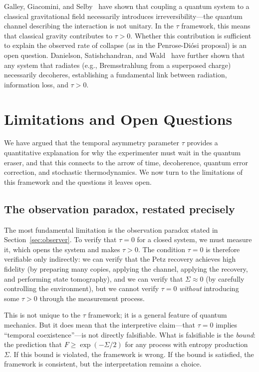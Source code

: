 \documentclass[12pt]{article}
\theoremstyle{definition}
\theoremstyle{remark}
\newcommand{\tauasym}{\tau}
\begin{document}
Galley, Giacomini, and Selby~\cite{Galley2023} have shown that
coupling a quantum system to a classical gravitational field
necessarily introduces irreversibility---the quantum channel
describing the interaction is not unitary.  In the $\tauasym$
framework, this means that classical gravity contributes to
$\tauasym > 0$.  Whether this contribution is sufficient to
explain the observed rate of collapse (as in the Penrose-Di\'osi
proposal) is an open question.
Danielson, Satishchandran, and Wald~\cite{Danielson2022} have
further shown that any system that radiates (e.g., Bremsstrahlung
from a superposed charge) necessarily decoheres, establishing a
fundamental link between radiation, information loss, and
$\tauasym > 0$.

\section{Limitations and Open Questions}
\label{sec:limitations}

We have argued that the temporal asymmetry parameter $\tauasym$
provides a quantitative explanation for why the experimenter must
wait in the quantum eraser, and that this connects to the arrow
of time, decoherence, quantum error correction, and stochastic
thermodynamics.  We now turn to the limitations of this framework
and the questions it leaves open.

\subsection{The observation paradox, restated precisely}

The most fundamental limitation is the observation paradox stated
in Section~\ref{sec:observer}.  To verify that $\tauasym = 0$
for a closed system, we must measure it, which opens the system
and makes $\tauasym > 0$.  The condition $\tauasym = 0$ is
therefore verifiable only indirectly: we can verify that the Petz
recovery achieves high fidelity (by preparing many copies,
applying the channel, applying the recovery, and performing
state tomography), and we can verify that $\Sigma \approx 0$
(by carefully controlling the environment), but we cannot verify
$\tauasym = 0$ \emph{without} introducing some $\tauasym > 0$
through the measurement process.

This is not unique to the $\tauasym$ framework; it is a general
feature of quantum mechanics.  But it does mean that the
interpretive claim---that $\tauasym = 0$ implies ``temporal
coexistence''---is not directly falsifiable.  What is falsifiable
is the \emph{bound}: the prediction that $F \geq \exp(-\Sigma/2)$
for any process with entropy production $\Sigma$.  If this bound
is violated, the framework is wrong.  If the bound is satisfied,
the framework is consistent, but the interpretation remains a
choice.
\end{document}

